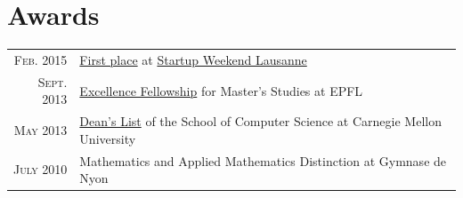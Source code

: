\documentclass[a4paper,11pt]{article} %
\begin{document}

\section{Awards}

\begin{tabular}{rl}

\textsc{Feb.} 2015 & 
\href{http://tasti.ch}{First place} at
\href{http://lausanne.startupweekend.org/}{Startup Weekend Lausanne}\\
\textsc{Sept.} 2013 & 
\href{http://master.epfl.ch/excellence-fellowships}{Excellence Fellowship} for Master's Studies at EPFL\\
\textsc{May} 2013 & 
\href{http://coursecatalog.web.cmu.edu/schoolofcomputerscience/#schoolofcomputersciencescsacademicstandardsandactions}{Dean's
List} of the School of Computer Science at Carnegie Mellon University\\
\textsc{July} 2010 & 
Mathematics and Applied Mathematics Distinction at Gymnase de Nyon\\
\end{tabular}

\pagebreak
{}


\end{document}
